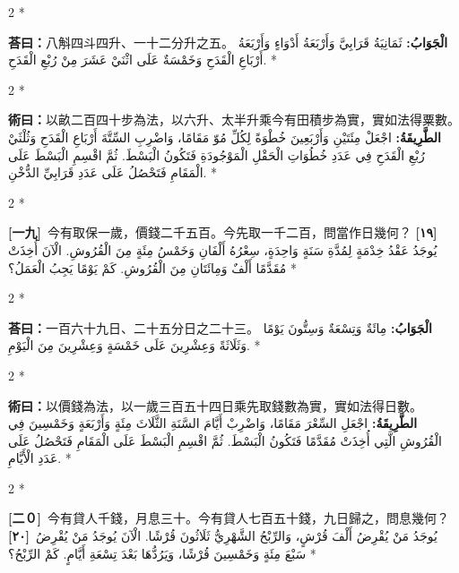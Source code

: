 \documentclass[11pt,a4paper]{article}
\newcommand{\ar}[1]{\arabicfont\beginR #1\endR}
\newcommand{\problemnum}[1]{\textbf{[\ignorespaces#1\unskip]}}
\newenvironment{bilingual}{%
  \begin{paracol}{2}%
  \switchcolumn[0]*%
}{%
  \end{paracol}%
}
\newcommand{\cnline}[1]{\switchcolumn[0]\noindent #1 \switchcolumn[1]}
\newcommand{\arline}[1]{\noindent\ar{#1} \switchcolumn[0]*}
\newenvironment{prob bilingual}{%
  \begin{paracol}{2}%
  \switchcolumn[0]*%
}{%
  \end{paracol}%
  \vspace{0.3em}%
}
\begin{document}
\begin{bilingual}
\cnline{\textcolor{answercolor}{\textbf{荅曰：}}八斛四斗四升、一十二分升之五。}
\arline{\textcolor{answercolor}{\textbf{الْجَوَابُ:}} ثَمَانِيَةُ قَرَابِيَّ وَأَرْبَعَةُ أَدْوَاءٍ وَأَرْبَعَةُ أَرْبَاعِ الْقَدَحِ وَخَمْسَةٌ عَلَى اثْنَيْ عَشَرَ مِنْ رُبْعِ الْقَدَحِ.}
\end{bilingual}

\begin{bilingual}
\cnline{%
\textcolor{methodcolor}{\textbf{術曰：}}以畝二百四十步為法，以六升、太半升乘今有田積步為實，實如法得粟數。
}
\arline{%
\textcolor{methodcolor}{\textbf{الطَّرِيقَةُ:}} اجْعَلْ مِئَتَيْنِ وَأَرْبَعِينَ خُطْوَةً لِكُلِّ مُوّ مَقَامًا، وَاضْرِبِ السِّتَّةَ أَرْبَاعِ الْقَدَحِ وَثُلْثَيْ رُبْعِ الْقَدَحِ فِي عَدَدِ خُطُوَاتِ الْحَقْلِ الْمَوْجُودَةِ فَتَكُونُ الْبَسْطَ. ثُمَّ اقْسِمِ الْبَسْطَ عَلَى الْمَقَامِ فَتَحْصُلُ عَلَى عَدَدِ قَرَابِيِّ الدُّخْنِ.
}
\end{bilingual}

\begin{bilingual}
\cnline{\problemnum{一九}\, 今有取保一歲，價錢二千五百。今先取一千二百，問當作日幾何？}
\arline{\problemnum{١٩}\, يُوجَدُ عَقْدُ خِدْمَةٍ لِمُدَّةِ سَنَةٍ وَاحِدَةٍ، سِعْرُهُ أَلْفَانِ وَخَمْسُ مِئَةٍ مِنَ الْقُرُوشِ. الْآنَ أُخِذَتْ مُقَدَّمًا أَلْفٌ وَمِائَتَانِ مِنَ الْقُرُوشِ. كَمْ يَوْمًا يَجِبُ الْعَمَلُ؟}
\end{bilingual}

\begin{bilingual}
\cnline{\textcolor{answercolor}{\textbf{荅曰：}}一百六十九日、二十五分日之二十三。}
\arline{\textcolor{answercolor}{\textbf{الْجَوَابُ:}} مِائَةٌ وَتِسْعَةٌ وَسِتُّونَ يَوْمًا وَثَلَاثَةً وَعِشْرِينَ عَلَى خَمْسَةٍ وَعِشْرِينَ مِنَ الْيَوْمِ.}
\end{bilingual}

\begin{bilingual}
\cnline{%
\textcolor{methodcolor}{\textbf{術曰：}}以價錢為法，以一歲三百五十四日乘先取錢數為實，實如法得日數。
}
\arline{%
\textcolor{methodcolor}{\textbf{الطَّرِيقَةُ:}} اجْعَلِ السِّعْرَ مَقَامًا، وَاضْرِبْ أَيَّامَ السَّنَةِ الثَّلَاثَ مِئَةٍ وَأَرْبَعَةٍ وَخَمْسِينَ فِي الْقُرُوشِ الَّتِي أُخِذَتْ مُقَدَّمًا فَتَكُونُ الْبَسْطَ. ثُمَّ اقْسِمِ الْبَسْطَ عَلَى الْمَقَامِ فَتَحْصُلُ عَلَى عَدَدِ الْأَيَّامِ.
}
\end{bilingual}

\begin{bilingual}
\cnline{\problemnum{二０}\, 今有貸人千錢，月息三十。今有貸人七百五十錢，九日歸之，問息幾何？}
\arline{\problemnum{٢٠}\, يُوجَدُ مَنْ يُقْرِضُ أَلْفَ قُرْشٍ، وَالرِّبْحُ الشَّهْرِيُّ ثَلَاثُونَ قُرْشًا. الْآنَ يُوجَدُ مَنْ يُقْرِضُ سَبْعَ مِئَةٍ وَخَمْسِينَ قُرْشًا، وَيَرُدُّهَا بَعْدَ تِسْعَةِ أَيَّامٍ. كَمْ الرِّبْحُ؟}
\end{bilingual}
\end{document}
